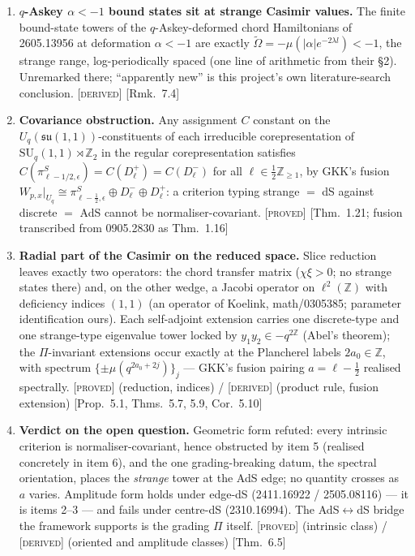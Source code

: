 \documentclass[10pt,a4paper]{article}
\newcommand{\PROVED}{{\color{ForestGreen}\textsc{[proved]}}}
\newcommand{\DERIVED}{{\color{teal}\textsc{[derived]}}}
\newcommand{\tCas}{\tilde\Omega}
\newcommand{\Z}{\mathbb{Z}}
\newcommand{\loc}[1]{{\small[#1]}}
\begin{document}
\begin{enumerate}[leftmargin=1.6em,itemsep=5pt,topsep=4pt]
\item \textbf{$q$-Askey $\alpha<-1$ bound states sit at strange Casimir values.} The finite bound-state towers of the $q$-Askey-deformed chord Hamiltonians of 2605.13956 at deformation $\alpha<-1$ are exactly $\tCas=-\mu(|\alpha|e^{-2\lambda l})<-1$, the strange range, log-periodically spaced (one line of arithmetic from their \S2). Unremarked there; ``apparently new'' is this project's own literature-search conclusion. \DERIVED{} \loc{Rmk.~7.4}

\item \textbf{Covariance obstruction.} Any assignment $C$ constant on the $U_q(\mathfrak{su}(1,1))$-constituents of each irreducible corepresentation of $\mathrm{SU}_q(1,1)\rtimes\Z_2$ in the regular corepresentation satisfies $C(\pi^{S}_{\ell-1/2,\epsilon})=C(D^{+}_{\ell})=C(D^{-}_{\ell})$ for all $\ell\in\tfrac12\Z_{\ge1}$, by GKK's fusion $W_{p,x}|_{U_q}\cong\pi^{S}_{\ell-\frac12,\epsilon}\oplus D^{-}_{\ell}\oplus D^{+}_{\ell}$: a criterion typing strange $=$ dS against discrete $=$ AdS cannot be normaliser-covariant. \PROVED{} \loc{Thm.~1.21; fusion transcribed from 0905.2830 as Thm.~1.16}

\item \textbf{Radial part of the Casimir on the reduced space.} Slice reduction leaves exactly two operators: the chord transfer matrix ($\chi\xi>0$; no strange states there) and, on the other wedge, a Jacobi operator on $\ell^{2}(\Z)$ with deficiency indices $(1,1)$ (an operator of Koelink, math/0305385; parameter identification ours). Each self-adjoint extension carries one discrete-type and one strange-type eigenvalue tower locked by $y_{1}y_{2}\in-q^{2\Z}$ (Abel's theorem); the $\Pi$-invariant extensions occur exactly at the Plancherel labels $2a_{0}\in\Z$, with spectrum $\{\pm\mu(q^{2a_{0}+2j})\}_{j}$ --- GKK's fusion pairing $a=\ell-\tfrac12$ realised spectrally. \PROVED{} (reduction, indices) / \DERIVED{} (product rule, fusion extension) \loc{Prop.~5.1, Thms.~5.7, 5.9, Cor.~5.10}

\item \textbf{Verdict on the open question.} Geometric form refuted: every intrinsic criterion is normaliser-covariant, hence obstructed by item 5 (realised concretely in item 6), and the one grading-breaking datum, the spectral orientation, places the \emph{strange} tower at the AdS edge; no quantity crosses as $a$ varies. Amplitude form holds under edge-dS (2411.16922 / 2505.08116) --- it is items 2--3 --- and fails under centre-dS (2310.16994). The AdS$\leftrightarrow$dS bridge the framework supports is the grading $\Pi$ itself. \PROVED{} (intrinsic class) / \DERIVED{} (oriented and amplitude classes) \loc{Thm.~6.5}

\end{enumerate}
\end{document}
